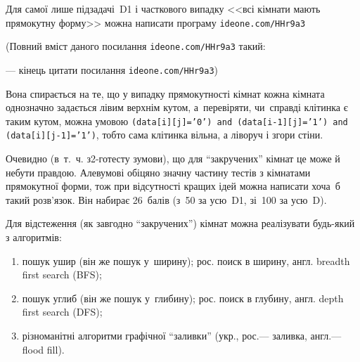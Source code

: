 \documentclass[14pt,a4paper]{extarticle}
\renewcommand{\baselinestretch}{1.3125}
\begin{document}
\Tutorial	%
Для самої лише підзадачі~D1 і часткового випадку <<всі кімнати мають прямокутну форму>> можна написати програму 
\verb"ideone.com/HHr9a3"


{\color{green}\begin{small}

\renewcommand{\baselinestretch}{0.875}

(Повний вміст даного посилання \verb"ideone.com/HHr9a3" такий:

--- кінець цитати посилання \verb"ideone.com/HHr9a3")

\end{small}}


\hspace{0.5em plus 1em}
Вона спирається на те, що у випадку прямокутності кімнат кожна кімната однозначно задається лівим верхнім кутом, а~перевіряти, чи~справді клітинка є таким кутом, можна умовою \texttt{\mbox{(data[i][j]='0')} \mbox{and} \mbox{(data[i-1][j]='1')} \mbox{and} \mbox{(data[i][j-1]='1')}}, тобто сама клітинка вільна, а ліворуч і згори стіни.

Очевидно (в~т.~ч. з\nolinebreak[3] \mbox{2-го}\nolinebreak[3] тесту з\nolinebreak[3] умови), що для ``закручених'' кімнат це може й не\nolinebreak[3] бути правдою. Але\nolinebreak[2] в\nolinebreak[3] умові обіцяно значну частину тестів з кімнатами прямокутної форми, тож при відсутності кращих ідей можна написати хоча~б такий розв’язок. Він набирає 26~балів (з~50 за усю~D1, зі~100 за усю~D).



Для відстеження (як завгодно ``закручених'') кімнат можна реалізувати будь-який з алгоритмів:

\begin{enumerate}

\item	
пошук ушир (він же пошук у~ширину); рос. поиск в ширину, англ. breadth first search (BFS);

\item
пошук углиб (він же пошук у~глибину); рос. поиск в глубину, англ. depth first search (DFS);

\item
різноманітні алгоритми графічної ``заливки'' (укр., рос.\nolinebreak[3] --- заливка, англ.\nolinebreak[3] --- flood fill).

\end{enumerate}
\end{document}
